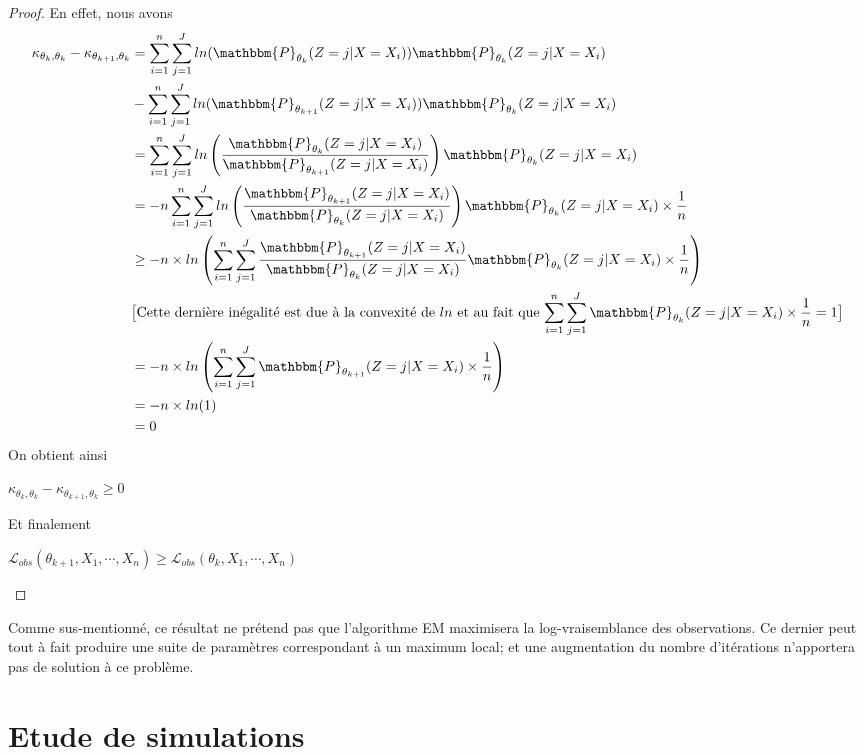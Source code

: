 \documentclass[frenchb]{report}
\newcommand{\1}{\mathbbm{1}}
\newcommand{\prob}{\mathbbm{P}}
\newcommand{\lv}{\mathcal{L}}
\theoremstyle{definition}\newtheorem{defn}{Définition}
\theoremstyle{definition}\newtheorem{exm}{Exemple}
\theoremstyle{definition}\newtheorem{nota}{Notation}
\theoremstyle{definition}\newtheorem{rem}{Remarque}
\begin{document}
\begin{proof}
En effet, nous avons
\begin{align*}
\kappa_{\theta_{k}, \theta_k}-\kappa_{\theta_{k+1}, \theta_k} &= \sum_{i=1}^n\sum_{j=1}^J ln(\prob_{\theta_k}(Z = j|X=X_i))\prob_{\theta_k}(Z = j|X = X_i) \\
&- \sum_{i=1}^n \sum_{j=1}^J ln(\prob_{\theta_{k+1}}(Z = j|X=X_i))\prob_{\theta_k}(Z = j|X = X_i) \\
&=\sum_{i=1}^n \sum_{j=1}^J ln\left(\frac{\prob_{\theta_k}(Z = j|X=X_i)}{\prob_{\theta_{k+1}}(Z = j|X=X_i)}\right)\prob_{\theta_k}(Z = j|X = X_i)\\
&= - n\sum_{i=1}^n \sum_{j=1}^J ln\left(\frac{\prob_{\theta_{k+1}}(Z = j|X=X_i)}{\prob_{\theta_k}(Z = j|X=X_i)}\right)\prob_{\theta_k}(Z = j|X = X_i)\times\frac{1}{n}\\
&\geq -n\times ln\left( \sum_{i=1}^n\sum_{j=1}^J \frac{\prob_{\theta_{k+1}}(Z = j|X=X_i)}{\prob_{\theta_k}(Z = j|X=X_i)}\prob_{\theta_k}(Z = j|X = X_i)\times\frac{1}{n} \right)\\
&\text{$\big[$Cette dernière inégalité est due à la convexité de $ln$ et au fait que $\displaystyle\sum_{i=1}^n\sum_{j=1}^J\prob_{\theta_k}(Z = j|X=X_i)\times\frac{1}{n}=1\big]$}\\
&= - n\times ln\left( \sum_{i=1}^n\sum_{j=1}^J\prob_{\theta_{k+1}}(Z = j|X=X_i)\times\frac{1}{n}\right)\\
&=  -n\times ln(1)\\
&= 0
\end{align*}
On obtient ainsi
\begin{center} $\kappa_{\theta_{k}, \theta_k}-\kappa_{\theta_{k+1}, \theta_k} \geq 0$ \end{center}
Et finalement
\begin{center} $\lv_{obs}(\theta_{k+1}, X_1, \cdots, X_n) \geq \lv_{obs}(\theta_k, X_1, \cdots, X_n)$ \end{center}
\end{proof}

Comme sus-mentionné, ce résultat ne prétend pas que l'algorithme EM maximisera la log-vraisemblance des observations. Ce dernier peut tout à fait produire une suite de paramètres correspondant à un maximum local; et une augmentation du nombre d'itérations n'apportera pas de solution à ce problème.
\newpage


\chapter{Etude de simulations}
\end{document}
